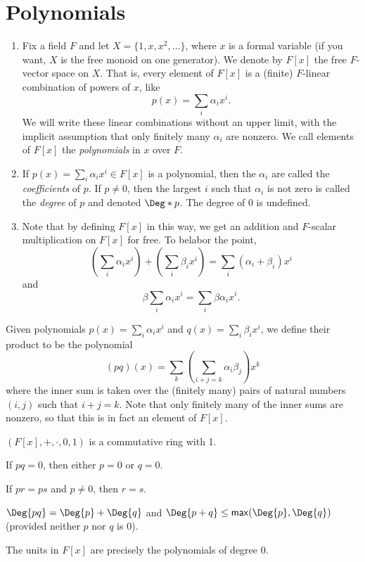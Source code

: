 \documentclass{memoir}
\begin{document}
\setcounter{section}{13}
\section{Polynomials}

\begin{dfn} \mbox{}
\begin{enumerate}
\item Fix a field $F$ and let $X = \{1, x, x^2, \ldots \}$, where $x$ is a formal variable (if you want, $X$ is the free monoid on one generator). We denote by $F[x]$ the free $F$-vector space on $X$. That is, every element of $F[x]$ is a (finite) $F$-linear combination of powers of $x$, like \[ p(x) = \sum_{i} \alpha_i x^i. \] We will write these linear combinations without an upper limit, with the implicit assumption that only finitely many $\alpha_i$ are nonzero. We call elements of $F[x]$ the \emph{polynomials} in $x$ over $F$.
\item If $p(x) = \sum_{i} \alpha_i x^i \in F[x]$ is a polynomial, then the $\alpha_i$ are called the \emph{coefficients} of $p$. If $p \neq 0$, then the largest $i$ such that $\alpha_i$ is not zero is called the \emph{degree} of $p$ and denoted $\Deg*{p}$. The degree of 0 is undefined.
\item Note that by defining $F[x]$ in this way, we get an addition and $F$-scalar multiplication on $F[x]$ for free. To belabor the point, \[ \left( \sum_{i} \alpha_i x^i \right) + \left( \sum_{i} \beta_i x^i \right) = \sum_{i} (\alpha_i+\beta_i)x^i \]  and \[ \beta \sum_{i} \alpha_i x^i = \sum_{i} \beta\alpha_i x^i. \]
\end{enumerate}
\end{dfn}

\begin{dfn}
Given polynomials $p(x) = \sum_{i} \alpha_i x^i$ and $q(x) = \sum_{i} \beta_i x^i$, we define their product to be the polynomial \[ (pq)(x) = \sum_{k} \left( \sum_{i+j=k} \alpha_i \beta_j \right) x^k \] where the inner sum is taken over the (finitely many) pairs of natural numbers $(i,j)$ such that $i+j=k$. Note that only finitely many of the inner sums are nonzero, so that this is in fact an element of $F[x]$.
\end{dfn}

\begin{prp} \mbox{}
\begin{enumerate*}
\item $(F[x],+,\cdot,0,1)$ is a commutative ring with 1.
\item If $pq = 0$, then either $p = 0$ or $q = 0$.
\item If $pr = ps$ and $p \neq 0$, then $r = s$.
\item $\Deg{pq} = \Deg{p} + \Deg{q}$ and $\Deg{p+q} \leq \mathsf{max}(\Deg{p}, \Deg{q})$ (provided neither $p$ nor $q$ is 0).
\item The units in $F[x]$ are precisely the polynomials of degree 0.
\end{enumerate*}
\end{prp}
\end{document}
